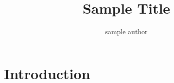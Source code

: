 \documentclass[twocolumn,10pt]{article}
\begin{document}
\title{
	Sample Title
}

\author{sample author}


\date{}

\maketitle

\begin{abstract}
\lipsum[1]
\end{abstract}

\section{Introduction}
\lipsum[2-15]

%
%
\end{document}
